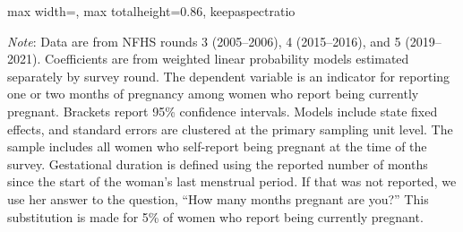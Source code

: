\documentclass[10pt,twoside,reqno]{article}
\begin{document}
\begin{table}[H]
\sffamily
\caption{: Women reporting one or two months of pregnancy differ from women reporting later pregnancy}
\label{tab:earlypregnancy}
\vspace{-8pt}

\begin{center}
\begin{scriptsize}
\setlength{\tabcolsep}{10pt}
\renewcommand{\arraystretch}{0.9}
\begin{adjustbox}{max width=\textwidth, max totalheight=0.86\textheight, keepaspectratio}

\end{adjustbox}
\end{scriptsize}
\end{center}

\vspace{0.5ex}
\vspace{0.5ex}
\small\scriptsize{\textsf{\textit{Note}: Data are from NFHS rounds 3 (2005--2006), 4 (2015--2016), and 5 (2019--2021). Coefficients are from weighted linear probability models estimated separately by survey round. The dependent variable is an indicator for reporting one or two months of pregnancy among women who report being currently pregnant. Brackets report 95\% confidence intervals. Models include state fixed effects, and standard errors are clustered at the primary sampling unit level.}}
\newline\small\scriptsize{\textsf{The sample includes all women who self-report being pregnant at the time of the survey.}}
\newline\small\scriptsize{\textsf{Gestational duration is defined using the reported number of months since the start of the woman's last menstrual period. If that was not reported, we use her answer to the question, ``How many months pregnant are you?'' This substitution is made for 5\% of women who report being currently pregnant.}}
\end{table}

\clearpage

\renewcommand{\thesection}{C}

\setcounter{equation}{0}
\renewcommand{\theequation}{C-\arabic{equation}}

\setcounter{figure}{0}
\renewcommand{\thefigure}{C-\arabic{figure}}
\end{document}
